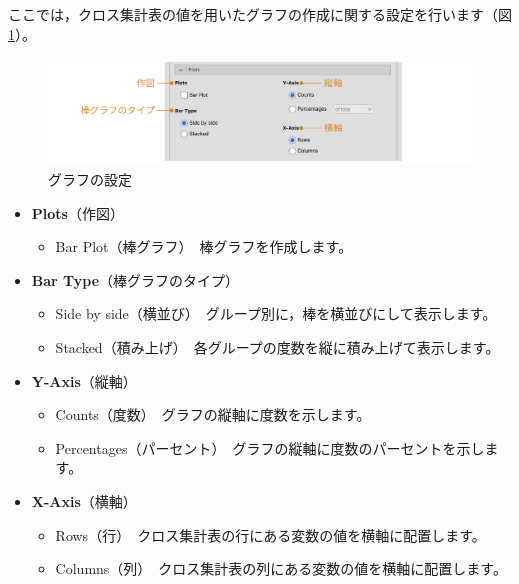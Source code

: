 \documentclass[
  12pt,
  a5jpaper,
  lualatex, ja=standard]{bxjsbook}
\providecommand{\tightlist}{%
  \setlength{\itemsep}{0pt}\setlength{\parskip}{0pt}}
\newenvironment{jmvsettings}{%
	\begin{center}%
	\begin{tcolorbox}[%
		title=設定項目,
		colframe=gmoji,
		colbacktitle=gmoji,
		colback=gmoji!2!white,
		breakable,
		width=.9\textwidth,
		]\small\addtolength{\leftmargini}{-3\labelsep}%
	}%
	{\end{tcolorbox}\end{center}}
\begin{document}
ここでは，クロス集計表の値を用いたグラフの作成に関する設定を行います（図\ref{fig:frequencies-chisq-plots}）。

\begin{figure}[!ht]

{\centering \includegraphics[width=1\linewidth]{images/frequencies/chisq-plots} 

}

\caption{グラフの設定}\label{fig:frequencies-chisq-plots}
\end{figure}

\begin{jmvsettings}

\begin{itemize}
\tightlist
\item
  \textbf{Plots}（作図）

  \begin{itemize}
  \tightlist
  \item
    Bar Plot（棒グラフ）　棒グラフを作成します。
  \end{itemize}
\item
  \textbf{Bar Type}（棒グラフのタイプ）

  \begin{itemize}
  \tightlist
  \item
    Side by side（横並び）　グループ別に，棒を横並びにして表示します。
  \item
    Stacked（積み上げ）　各グループの度数を縦に積み上げて表示します。
  \end{itemize}
\item
  \textbf{Y-Axis}（縦軸）

  \begin{itemize}
  \tightlist
  \item
    Counts（度数）　グラフの縦軸に度数を示します。
  \item
    Percentages（パーセント）　グラフの縦軸に度数のパーセントを示します。
  \end{itemize}
\item
  \textbf{X-Axis}（横軸）

  \begin{itemize}
  \tightlist
  \item
    Rows（行）　クロス集計表の行にある変数の値を横軸に配置します。
  \item
    Columns（列）　クロス集計表の列にある変数の値を横軸に配置します。
  \end{itemize}
\end{itemize}

\end{jmvsettings}
\end{document}
